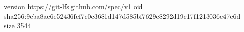 version https://git-lfs.github.com/spec/v1
oid sha256:9cba8ae6e52436fcf7c0c3681d147d585bf7629e8292d19c17f1213036e47c6d
size 3544
